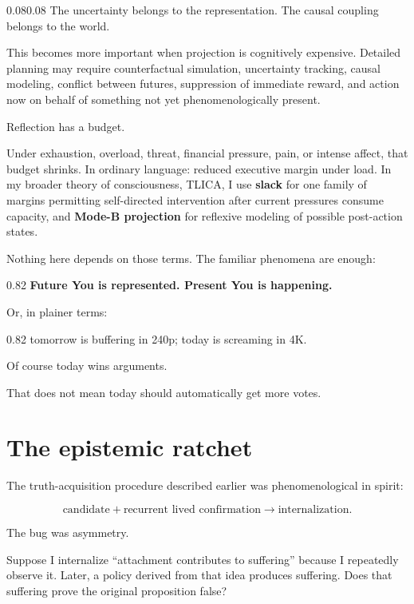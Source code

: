 \documentclass[10pt,letterpaper]{article}
\newenvironment{paperbody}
  {\begin{adjustwidth}{0.08\textwidth}{0.08\textwidth}\justifying}
  {\par\end{adjustwidth}}
\newenvironment{voicebox}
  {\Needspace{3.5\baselineskip}\par\vspace{0.22em}\begin{center}\begingroup
   \begin{lrbox}{\voiceboxsave}\begin{varwidth}{0.82\linewidth}
   \small\rmfamily\upshape\RaggedRight}
  {\end{varwidth}\end{lrbox}\fbox{\usebox{\voiceboxsave}}
   \endgroup\end{center}\vspace{0.22em}}
\let\oldsection\section
\renewcommand{\section}{\Needspace{6\baselineskip}\oldsection}
\begin{document}
\begin{paperbody}
The uncertainty belongs to the representation. The causal coupling
belongs to the world.

This becomes more important when projection is cognitively expensive.
Detailed planning may require counterfactual simulation, uncertainty
tracking, causal modeling, conflict between futures, suppression of
immediate reward, and action now on behalf of something not yet
phenomenologically present.

Reflection has a budget.

Under exhaustion, overload, threat, financial pressure, pain, or intense
affect, that budget shrinks. In ordinary language: reduced executive
margin under load. In my broader theory of consciousness, TLICA, I use
\textbf{slack} for one family of margins permitting self-directed
intervention after current pressures consume capacity, and
\textbf{Mode-B projection} for reflexive modeling of possible
post-action states.

Nothing here depends on those terms. The familiar phenomena are enough:

\begin{voicebox}
\textbf{Future You is represented. Present You is happening.}
\end{voicebox}

Or, in plainer terms:

\begin{voicebox}
tomorrow is buffering in 240p; today is screaming in 4K.
\end{voicebox}

Of course today wins arguments.

That does not mean today should automatically get more votes.

\section{The epistemic ratchet}\label{the-epistemic-ratchet}

The truth-acquisition procedure described earlier was phenomenological
in spirit:

\[
\text{candidate}
+
\text{recurrent lived confirmation}
\to
\text{internalization}.
\]

The bug was asymmetry.

Suppose I internalize ``attachment contributes to suffering'' because I
repeatedly observe it. Later, a policy derived from that idea produces
suffering. Does that suffering prove the original proposition false?


\end{paperbody}
\end{document}
